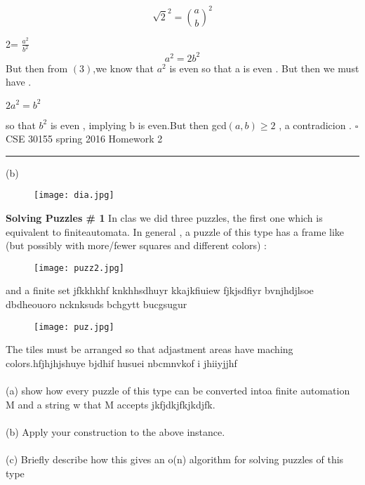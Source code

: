 \documentclass{exam}
\begin{document}
 \begin{equation}
     \sqrt{2}^2=\binom{a}{b}^2
 \end{equation}
 
\hspace{6.5cm} 2= $\frac{a^2}{b^2}$
 \begin{equation}
   a^2=2b^2
 \end{equation}
 But then from $(3)$,we know that $a^2$ is even so that a is even . But then we must have .
  \begin{center}
       $2a^2=b^2$
  \end{center}
so that $b^2$ is even , implying b is even.But then         gcd$(a,b)\ge 2 $ , a contradicion . \hspace{12.5cm}$\square $ 
\newpage
\huge{CSE 30155 spring 2016} \hspace{5cm}Homework 2
\hrule 
\vspace{1.5cm}
(b)
\begin{figure}[h]
   \texttt{[image: dia.jpg]}
    
\end{figure}

\Large \textbf{Solving Puzzles \# 1} In clas  we did three puzzles, the first one which is equivalent to finiteautomata. In general , a puzzle of this type has a frame like (but possibly with more/fewer squares and different colors) :
\begin{figure}[h]
\centering
 \texttt{[image: puzz2.jpg]}
\end{figure} 
 and a finite set jfkkhkhf knkhhsdhuyr kkajkfiuiew fjkjsdfiyr bvnjhdjlsoe dbdheouoro ncknksuds bchgytt bucgsugur
 \begin{figure}[h]
     \centering
     \texttt{[image: puz.jpg]}
 \end{figure}
 \newpage
  The tiles must be arranged so that adjastment areas have maching colors.hfjhjhjshuye bjdhif husuei nbcmnvkof i jhiiyjjhf \\ \\
 (a) show how every puzzle of this type can be converted intoa finite automation M and a string w that M accepts jkfjdkjfkjkdjfk. \\ \\
 (b) Apply your construction to the above instance.\\  \\
 (c) Briefly describe how this gives an o(n) algorithm for solving puzzles of this type
\end{document}
